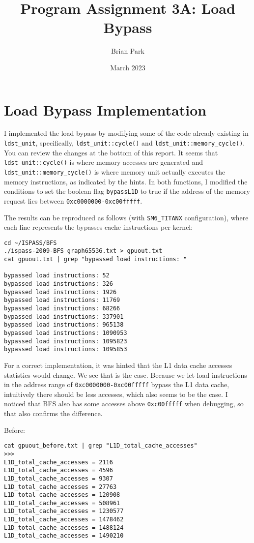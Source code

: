 \documentclass{article}
\title{Program Assignment 3A: Load Bypass}
\author{Brian Park}
\affil{North Carolina State University, Computer Engineering 786}
\date{March 2023}
\begin{document}
\maketitle

\section{Load Bypass Implementation}
I implemented the load bypass by modifying some of the code already existing in \verb|ldst_unit|, specifically, \verb|ldst_unit::cycle()| and \verb|ldst_unit::memory_cycle()|. You can review the changes at the bottom of this report. It seems that \verb|ldst_unit::cycle()| is where memory accesses are generated and \verb|ldst_unit::memory_cycle()| is where memory unit actually executes the memory instructions, as indicated by the hints. In both functions, I modified the conditions to set the boolean flag \verb|bypassL1D| to true if the address of the memory request lies between \verb|0xc0000000-0xc00fffff|.


The results can be reproduced as follows (with \verb|SM6_TITANX| configuration), where each line represents the bypasses cache instructions per kernel:
\begin{verbatim}
cd ~/ISPASS/BFS
./ispass-2009-BFS graph65536.txt > gpuout.txt
cat gpuout.txt | grep "bypassed load instructions: "

bypassed load instructions: 52
bypassed load instructions: 326
bypassed load instructions: 1926
bypassed load instructions: 11769
bypassed load instructions: 68266
bypassed load instructions: 337901
bypassed load instructions: 965138
bypassed load instructions: 1090953
bypassed load instructions: 1095823
bypassed load instructions: 1095853
\end{verbatim}

For a correct implementation, it was hinted that the L1 data cache accesses statistics would change. We see that is the case. Because we let load instructions in the address range of \verb|0xc0000000-0xc00fffff| bypass the L1 data cache, intuitively there should be less accesses, which also seems to be the case. I noticed that BFS also has some accesses above \verb|0xc00fffff| when debugging, so that also confirms the difference.

Before:
\begin{verbatim}
cat gpuout_before.txt | grep "L1D_total_cache_accesses"
>>>
L1D_total_cache_accesses = 2116
L1D_total_cache_accesses = 4596
L1D_total_cache_accesses = 9307
L1D_total_cache_accesses = 27763
L1D_total_cache_accesses = 120908
L1D_total_cache_accesses = 508961
L1D_total_cache_accesses = 1230577
L1D_total_cache_accesses = 1478462
L1D_total_cache_accesses = 1488124
L1D_total_cache_accesses = 1490210
\end{verbatim}
\end{document}

